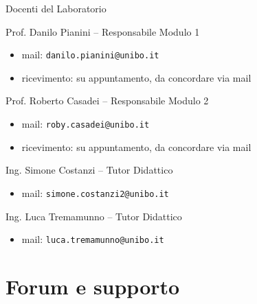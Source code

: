 \documentclass[xcolor=dvipsnames,presentation]{beamer}
\begin{document}
\begin{frame}{Docenti del Laboratorio}
    \begin{block}{Prof. Danilo Pianini -- Responsabile Modulo 1}
        \begin{itemize}
            \item mail: \texttt{danilo.pianini@unibo.it}
            \item ricevimento: su appuntamento, da concordare via mail
        \end{itemize}
    \end{block}
    \begin{block}{Prof. Roberto Casadei -- Responsabile Modulo 2}
        \begin{itemize}
            \item mail: \texttt{roby.casadei@unibo.it}
            \item ricevimento: su appuntamento, da concordare via mail
        \end{itemize}
    \end{block}
    \begin{block}{Ing. Simone Costanzi -- Tutor Didattico}
        \begin{itemize}
            \item mail: \texttt{simone.costanzi2@unibo.it}
        \end{itemize}
    \end{block}
    \begin{block}{Ing. Luca Tremamunno -- Tutor Didattico}
        \begin{itemize}
            \item mail: \texttt{luca.tremamunno@unibo.it}
        \end{itemize}
    \end{block}
\end{frame}

\section{Forum e supporto}
\end{document}
